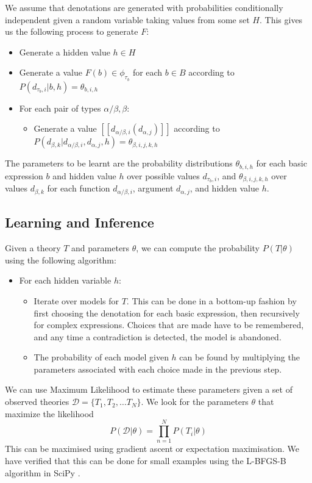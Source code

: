 \documentclass[11pt]{article}
\theoremstyle{definition}
\newcommand{\interp}[1]{[\![ #1 ]\!]}
\begin{document}
We assume that denotations are generated with probabilities
conditionally independent given a random variable taking values from
some set $H$. This gives us the following process to generate $F$:
\begin{itemize}
\item Generate a hidden value $h\in H$
\item Generate a value $F(b) \in \phi_{\tau_b}$ for each $b\in B$ according to
  $P(d_{\tau_b,i}|b, h) = \theta_{b,i,h}$
\item For each pair of types $\alpha/\beta, \beta$:
\begin{itemize}
\item Generate a value $\interp{d_{\alpha/\beta,i}(d_{\alpha,j})}$
  according to $P(d_{\beta,k}|d_{\alpha/\beta,i}, d_{\alpha,j},h) = \theta_{\beta,i,j,k,h}$
\end{itemize}
\end{itemize}
The parameters to be learnt are the probability distributions
$\theta_{b,i,h}$ for each basic expression $b$ and hidden value $h$
over possible values $d_{\tau_b,i}$, and $\theta_{\beta,i,j,k,h}$ over
values $d_{\beta,k}$ for each function $d_{\alpha/\beta,i}$, argument
$d_{\alpha,j}$, and hidden value $h$.

\subsection{Learning and Inference}

Given a theory $T$ and parameters $\theta$, we can compute the
probability $P(T|\theta)$ using the following algorithm:
\begin{itemize}
\item For each hidden variable $h$:
\begin{itemize}
\item Iterate over models for $T$. This can be done in a bottom-up
  fashion by first choosing the denotation for each basic expression,
  then recursively for complex expressions. Choices that are made have
  to be remembered, and any time a contradiction is detected, the
  model is abandoned.
\item The probability of each model given $h$ can be found by
  multiplying the parameters associated with each choice made in the
  previous step.
\end{itemize}
\end{itemize}

We can use Maximum Likelihood to estimate these parameters given a set
of observed theories $\mathcal{D} = \{T_1, T_2, \ldots T_N\}$. We look
for the parameters $\theta$ that maximize the likelihood
$$P(\mathcal{D}|\theta) = \prod_{n=1}^N P(T_i|\theta)$$ This can be
maximised using gradient ascent or expectation maximisation. We have
verified that this can be done for small examples using the L-BFGS-B
algorithm in SciPy \cite{Zhu:97}.
\end{document}
